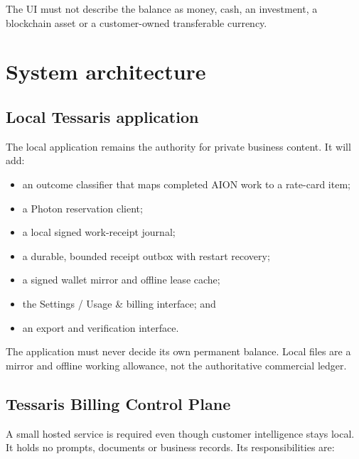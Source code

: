 \documentclass[11pt]{article}
\begin{document}
The UI must not describe the balance as money, cash, an investment, a blockchain asset or a customer-owned transferable currency.

\section{System architecture}

\subsection{Local Tessaris application}

The local application remains the authority for private business content. It will add:

\begin{itemize}
  \item an outcome classifier that maps completed AION work to a rate-card item;
  \item a Photon reservation client;
  \item a local signed work-receipt journal;
  \item a durable, bounded receipt outbox with restart recovery;
  \item a signed wallet mirror and offline lease cache;
  \item the Settings / Usage \& billing interface; and
  \item an export and verification interface.
\end{itemize}

The application must never decide its own permanent balance. Local files are a mirror and offline working allowance, not the authoritative commercial ledger.

\subsection{Tessaris Billing Control Plane}

A small hosted service is required even though customer intelligence stays local. It holds no prompts, documents or business records. Its responsibilities are:
\end{document}
